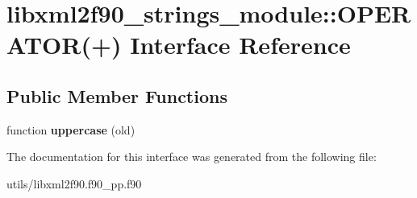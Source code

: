 \hypertarget{interfacelibxml2f90__strings__module_1_1OPERATOR_07_09_08}{
\section{libxml2f90\_\-strings\_\-module::OPERATOR(+) Interface Reference}
\label{interfacelibxml2f90__strings__module_1_1OPERATOR_07_09_08}
}
\subsection*{Public Member Functions}
\begin{DoxyCompactItemize}
\item 
\hypertarget{interfacelibxml2f90__strings__module_1_1OPERATOR_07_09_08_ac9889d9ca179af65a823c1aeb2e48bbd}{
function {\bfseries uppercase} (old)}
\label{interfacelibxml2f90__strings__module_1_1OPERATOR_07_09_08_ac9889d9ca179af65a823c1aeb2e48bbd}

\end{DoxyCompactItemize}


The documentation for this interface was generated from the following file:\begin{DoxyCompactItemize}
\item 
utils/libxml2f90.f90\_\-pp.f90\end{DoxyCompactItemize}
